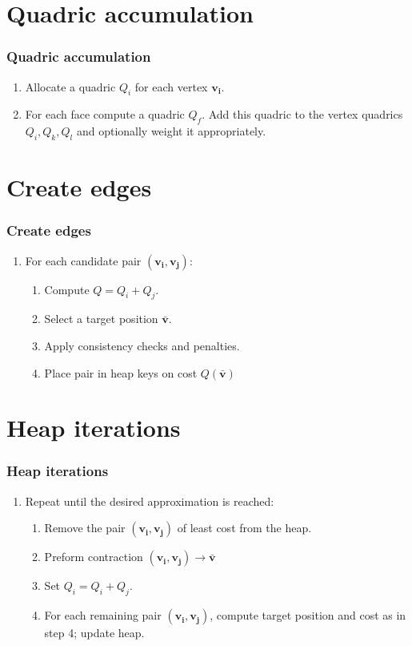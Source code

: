 \documentclass[
	10pt,
	t		%
]{beamer}
\begin{document}
\section{Quadric accumulation}
\begin{frame}
\frametitle{Quadric accumulation}
\centering
\begin{enumerate}
\item Allocate a quadric $Q_i$ for each vertex $\mathbf{v_i}$.
\item For each face compute a quadric $Q_f$. Add this quadric to the vertex quadrics $Q_i, Q_k, Q_l$ and optionally weight it appropriately.
\end{enumerate}
\end{frame}

\section{Create edges}
\begin{frame}
\frametitle{Create edges}
\centering
\begin{enumerate}
\item For each candidate pair $(\mathbf{v_i}, \mathbf{v_j})$:
\begin{enumerate}
\item Compute $Q = Q_i + Q_j$.
\item Select a target position $\mathbf{\bar{v}}$.
\item Apply consistency checks and penalties.
\item Place pair in heap keys on cost $Q(\mathbf{\bar{v}})$
\end{enumerate}
\end{enumerate}
\end{frame}

\section{Heap iterations}
\begin{frame}
\frametitle{Heap iterations}
\centering
\begin{enumerate}
\item Repeat until the desired approximation is reached:
\begin{enumerate}
\item Remove the pair $(\mathbf{v_i}, \mathbf{v_j})$ of least cost from the heap.
\item Preform contraction $(\mathbf{v_i}, \mathbf{v_j})\rightarrow\bar{\mathbf{v}}$
\item Set $Q_i = Q_i + Q_j$.
\item For each remaining pair $(\mathbf{v_i}, \mathbf{v_j})$, compute target position and cost as in step 4; update heap.
\end{enumerate}
\end{enumerate}
\end{frame}
\end{document}
